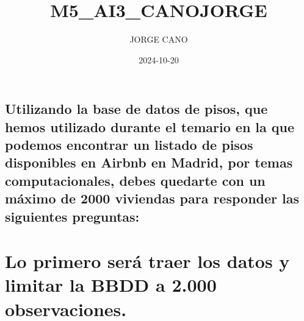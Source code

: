 \documentclass[
]{article}
\title{M5\_AI3\_CANOJORGE}
\author{JORGE CANO}
\date{2024-10-20}
\begin{document}
\maketitle

\subsection{Utilizando la base de datos de pisos, que hemos utilizado
durante el temario en la que podemos encontrar un listado de pisos
disponibles en Airbnb en Madrid, por temas computacionales, debes
quedarte con un máximo de 2000 viviendas para responder las siguientes
preguntas:}\label{utilizando-la-base-de-datos-de-pisos-que-hemos-utilizado-durante-el-temario-en-la-que-podemos-encontrar-un-listado-de-pisos-disponibles-en-airbnb-en-madrid-por-temas-computacionales-debes-quedarte-con-un-muxe1ximo-de-2000-viviendas-para-responder-las-siguientes-preguntas}

\section{Lo primero será traer los datos y limitar la BBDD a 2.000
observaciones.}\label{lo-primero-seruxe1-traer-los-datos-y-limitar-la-bbdd-a-2.000-observaciones.}
\end{document}
